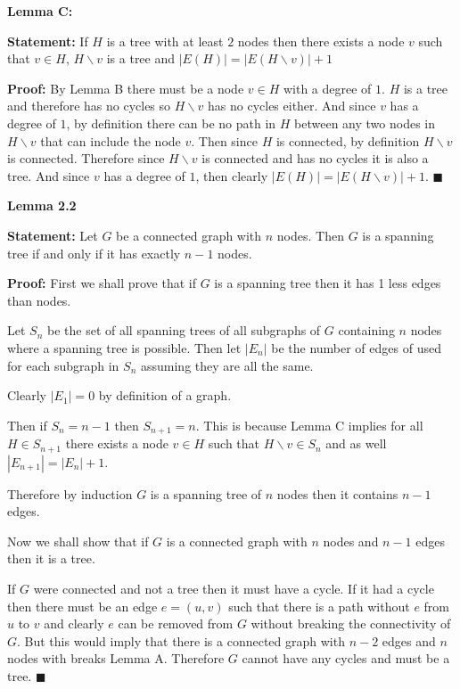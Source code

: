 \documentclass{article}
\newcommand*{\QEDA}{\hfill\ensuremath{\blacksquare}}%
\begin{document}
\textbf{Lemma C:} 

\textbf{Statement:} If $H$ is a tree with at least $2$ nodes then there exists a node $v$ such that $v \in H$, $H \backslash v$ is a tree and $|E(H)| = |E(H \backslash v)| + 1$ 

\textbf{Proof:} By Lemma B there must be a node $v \in H$ with a degree of $1$. $H$ is a tree and therefore has no cycles so $H \backslash v$ has no cycles either. And since $v$ has a degree of $1$, by definition there can be no path in $H$ between any two nodes in $H \backslash v$ that can include the node $v$. Then since $H$ is connected, by definition $H \backslash v$ is connected. Therefore since $H \backslash v$ is connected and has no cycles it is also a tree. And since $v$ has a degree of $1$, then clearly $|E(H)| = |E(H \backslash v)| + 1$. 
\QEDA
 

\textbf{Lemma 2.2}

\textbf{Statement:} Let $G$ be a connected graph with $n$ nodes. Then $G$ is a spanning tree if and only if it has exactly $n-1$ nodes.

\textbf{Proof:} 
First we shall prove that if $G$ is a spanning tree then it has 1 less edges than nodes.

Let $S_n$ be the set of all spanning trees of all subgraphs of $G$ containing $n$ nodes where a spanning tree is possible. Then let $|E_n|$ be the number of edges of used for each subgraph in $S_n$ assuming they are all the same. 

Clearly $|E_1| = 0$ by definition of a graph.

Then if $S_n = n-1$ then $S_{n+1} = n $. 
This is because Lemma C implies for all $H \in S_{n+1}$ there exists a node $v \in H$ such that $H \backslash v \in S_{n}$ and as well $|E_{n+1}| = |E_{n}| + 1$. 

Therefore by induction $G$ is a spanning tree of $n$ nodes then it contains $n-1$ edges.

Now we shall show that if $G$ is a connected graph with $n$ nodes and $n-1$ edges then it is a tree. 

If $G$ were connected and not a tree then it must have a cycle. If it had a cycle then there must be an edge $e = (u,v)$ such that there is a path without $e$ from $u$ to $v$ and clearly $e$ can be removed from $G$ without breaking the connectivity of $G$. But this would imply that there is a connected graph with $n-2$ edges and $n$ nodes with breaks Lemma A. Therefore $G$ cannot have any cycles and must be a tree. 
\QEDA
\end{document}
